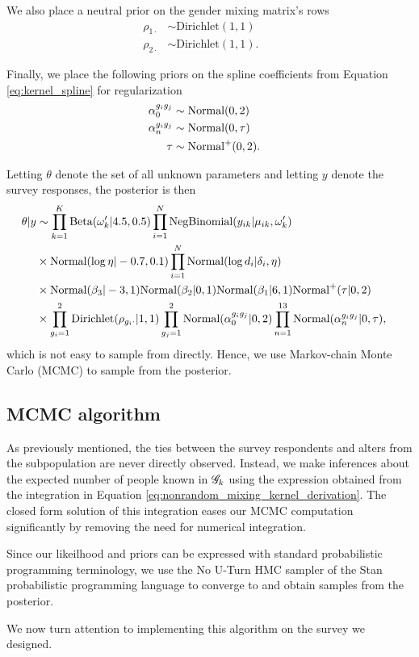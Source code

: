 We also place a neutral prior on the gender mixing matrix's rows
\begin{align}
\rho_{1\cdot} &\sim \text{Dirichlet}(1,1) &&\\\nonumber
\rho_{2\cdot} &\sim \text{Dirichlet}(1,1).
\end{align}

Finally, we place the following priors on the spline coefficients from Equation \ref{eq:kernel_spline} for regularization
\begin{align}
\alpha_0^{g_ig_j} &\sim \text{Normal}(0,2) &&\\\nonumber 
\alpha_n^{g_ig_j} &\sim \text{Normal}(0,\tau) &&\\\nonumber
\tau &\sim \text{Normal}^+(0, 2).
\end{align}

Letting $\theta$ denote the set of all unknown parameters and letting $y$ denote the survey responses, the posterior is then
\begin{align}
\theta | y &\sim 
\prod_{k=1}^K  \text{Beta}(\omega_k' | 4.5, 0.5) \prod_{i=1}^N \text{NegBinomial}(y_{ik} | \mu_{ik}, \omega_k') && \\\nonumber
&\times \text{Normal}(\log \eta | -0.7, 0.1) \prod_{i=1}^N \text{Normal}(\log d_i | \delta_i, \eta) &&\\\nonumber
&\times \text{Normal}(\beta_3 | -3, 1) \text{Normal}(\beta_2 | 0, 1) \text{Normal}(\beta_1 | 6, 1) \text{Normal}^+(\tau | 0, 2) &&\\\nonumber
&\times \prod_{g_i = 1}^2 \text{Dirichlet}(\rho_{g_i\cdot}|1,1) \prod_{g_j = 1}^2 \text{Normal}(\alpha_0^{g_ig_j} | 0, 2) \prod_{n=1}^{13} \text{Normal}(\alpha_n^{g_ig_j} | 0, \tau),
\end{align}
which is not easy to sample from directly. Hence, we use Markov-chain Monte Carlo (MCMC) to sample from the posterior.

\subsection{MCMC algorithm}
\label{subsec:kernel_fitting}

As previously mentioned, the ties between the survey respondents and alters from the subpopulation are never directly observed. Instead, we make inferences about the expected number of people known in $\mathcal{G}_k$ using the expression obtained from the integration in Equation \ref{eq:nonrandom_mixing_kernel_derivation}. The closed form solution of this integration eases our MCMC computation significantly by removing the need for numerical integration. 

Since our likeilhood and priors can be expressed with standard probabilistic programming terminology, we use the No U-Turn HMC sampler of the Stan probabilistic programming language \citep{Stan:2016} to converge to and obtain samples from the posterior.

We now turn attention to implementing this algorithm on the survey we designed.
